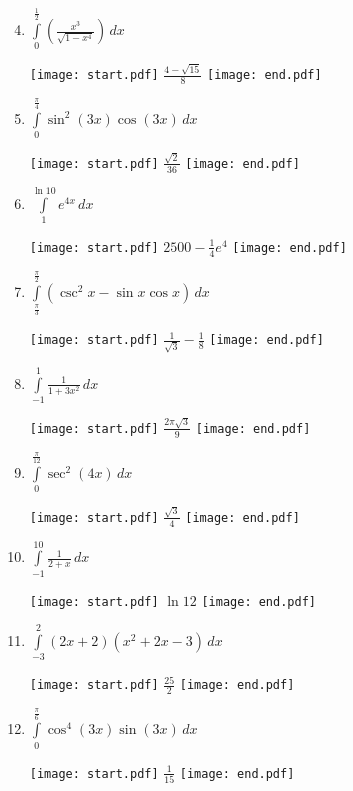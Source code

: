 \documentclass[12pt]{article}
\begin{document}
\begin{enumerate}
\setcounter{enumi}{3}

\item $\int\limits_{0}^{\frac{1}{2}}\left(\frac{x^3}{\sqrt{1-x^4}}\right)\,dx$ 

\texttt{[image: start.pdf]}
{{$\frac{4-\sqrt{15}}{8}$}}
\texttt{[image: end.pdf]}


\item $\int\limits_{0}^{\frac{\pi}{4}} \sin^{2}(3x)\cos{(3x)}\,dx$ 

\texttt{[image: start.pdf]}
{{$\frac{\sqrt{2}}{36}$}}
\texttt{[image: end.pdf]}


\item $\int\limits_{1}^{\ln{10}}e^{4x}\,dx$ 

\texttt{[image: start.pdf]}
{{$2500-\frac{1}{4}e^{4}$}}
\texttt{[image: end.pdf]}


\item $\int\limits_{\frac{\pi}{3}}^{\frac{\pi}{2}}(\csc^{2}{x}-\sin{x}\cos{x})\,dx$ 

\texttt{[image: start.pdf]}
{{$\frac{1}{\sqrt{3}}-\frac{1}{8}$}}
\texttt{[image: end.pdf]}


\item $\int\limits_{-1}^{1}\frac{1}{1+3x^2}\,dx$ 

\texttt{[image: start.pdf]}
{{$\frac{2\pi\sqrt{3}}{9}$}}
\texttt{[image: end.pdf]}


\item $\int\limits_{0}^{\frac{\pi}{12}} \sec^2{(4x)}\,dx$ 

\texttt{[image: start.pdf]}
{{$\frac{\sqrt{3}}{4}$}}
\texttt{[image: end.pdf]}


\item $\int\limits_{-1}^{10}\frac{1}{2+x}\,dx$ 

\texttt{[image: start.pdf]}
{{$\ln{12}$}}
\texttt{[image: end.pdf]}


\item $\int\limits_{-3}^{2} (2x+2)(x^2+2x-3)\,dx$ 

\texttt{[image: start.pdf]}
{{$\frac{25}{2}$}}
\texttt{[image: end.pdf]}


\item $\int\limits_{0}^{\frac{\pi}{6}} \cos^4{(3x)}\sin{(3x)}\,dx$ 

\texttt{[image: start.pdf]}
{{$\frac{1}{15}$}}
\texttt{[image: end.pdf]}



\end{enumerate}
\end{document}
